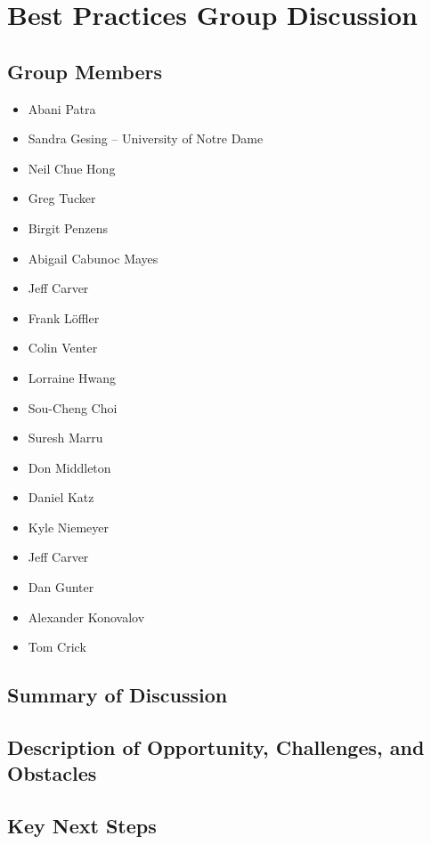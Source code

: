 \section{Best Practices Group Discussion}
\label{sec:appendix_best_practices}


\subsection{Group Members}

\begin{itemize}
\item Abani Patra 
\item Sandra Gesing -- University of Notre Dame
\item Neil Chue Hong 
\item Greg Tucker 
\item Birgit Penzens 
\item Abigail Cabunoc Mayes 
\item Jeff Carver 
\item Frank L\"offler 
\item Colin Venter 
\item Lorraine Hwang 
\item Sou-Cheng Choi
\item Suresh Marru 
\item Don Middleton 
\item Daniel Katz  
\item Kyle Niemeyer 
\item Jeff Carver 
\item Dan Gunter 
\item Alexander Konovalov 
\item Tom Crick 

\end{itemize}

\subsection{Summary of Discussion}

\subsection{Description of Opportunity, Challenges, and Obstacles}


\subsection{Key Next Steps}


